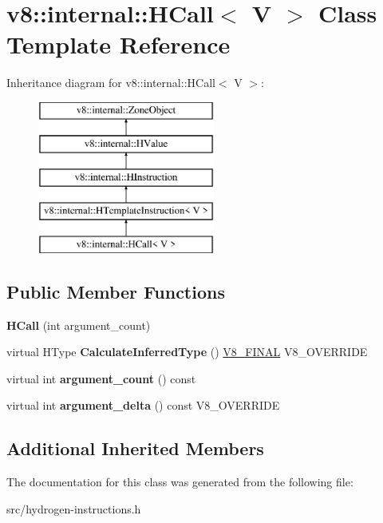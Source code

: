 \hypertarget{classv8_1_1internal_1_1_h_call}{}\section{v8\+:\+:internal\+:\+:H\+Call$<$ V $>$ Class Template Reference}
\label{classv8_1_1internal_1_1_h_call}
Inheritance diagram for v8\+:\+:internal\+:\+:H\+Call$<$ V $>$\+:\begin{figure}[H]
\begin{center}
\leavevmode
\includegraphics[height=5.000000cm]{classv8_1_1internal_1_1_h_call}
\end{center}
\end{figure}
\subsection*{Public Member Functions}
\begin{DoxyCompactItemize}
\item 
\hypertarget{classv8_1_1internal_1_1_h_call_a7b635fa53717780c7a44b2a71b5b5cb0}{}{\bfseries H\+Call} (int argument\+\_\+count)\label{classv8_1_1internal_1_1_h_call_a7b635fa53717780c7a44b2a71b5b5cb0}

\item 
\hypertarget{classv8_1_1internal_1_1_h_call_a0eb753d84b7ee3d014ed610520cca6e8}{}virtual H\+Type {\bfseries Calculate\+Inferred\+Type} () \hyperlink{classv8_1_1internal_1_1_v8___f_i_n_a_l}{V8\+\_\+\+F\+I\+N\+A\+L} V8\+\_\+\+O\+V\+E\+R\+R\+I\+D\+E\label{classv8_1_1internal_1_1_h_call_a0eb753d84b7ee3d014ed610520cca6e8}

\item 
\hypertarget{classv8_1_1internal_1_1_h_call_ab0ce30c1b02fc12cbf77cbe4b03f6ffb}{}virtual int {\bfseries argument\+\_\+count} () const \label{classv8_1_1internal_1_1_h_call_ab0ce30c1b02fc12cbf77cbe4b03f6ffb}

\item 
\hypertarget{classv8_1_1internal_1_1_h_call_a0346ea9fc3d26d8d66e5de64c4615557}{}virtual int {\bfseries argument\+\_\+delta} () const V8\+\_\+\+O\+V\+E\+R\+R\+I\+D\+E\label{classv8_1_1internal_1_1_h_call_a0346ea9fc3d26d8d66e5de64c4615557}

\end{DoxyCompactItemize}
\subsection*{Additional Inherited Members}


The documentation for this class was generated from the following file\+:\begin{DoxyCompactItemize}
\item 
src/hydrogen-\/instructions.\+h\end{DoxyCompactItemize}
